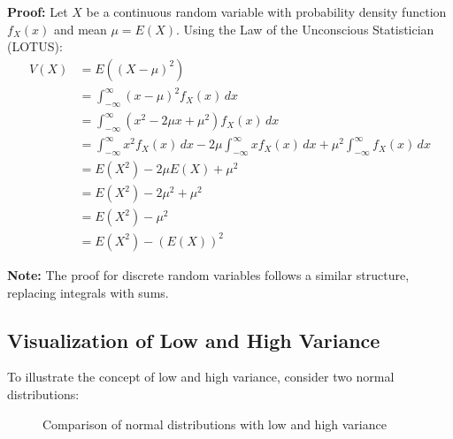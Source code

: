 \documentclass{article}
\begin{document}
    \noindent
    \textbf{Proof:}
    Let $X$ be a continuous random variable with probability density function $f_X(x)$ and mean $\mu = E(X)$.
    Using the Law of the Unconscious Statistician (LOTUS):
    \begin{align*}
        V(X) &= E((X - \mu)^2) \\
             &= \int_{-\infty}^{\infty} (x - \mu)^2 f_X(x) \, dx \\
             &= \int_{-\infty}^{\infty} (x^2 - 2\mu x + \mu^2) f_X(x) \, dx \\
             &= \int_{-\infty}^{\infty} x^2 f_X(x) \, dx - 2\mu \int_{-\infty}^{\infty} x f_X(x) \, dx + \mu^2 \int_{-\infty}^{\infty} f_X(x) \, dx \\
             &= E(X^2) - 2\mu E(X) + \mu^2 \\
             &= E(X^2) - 2\mu^2 + \mu^2 \\
             &= E(X^2) - \mu^2 \\
             &= E(X^2) - (E(X))^2
    \end{align*}

    \noindent
    \textbf{Note:} The proof for discrete random variables follows a similar structure, replacing integrals with sums.

    \subsection*{Visualization of Low and High Variance}

    To illustrate the concept of low and high variance, consider two normal distributions:

    \begin{figure}[h]
        \centering
        \caption{Comparison of normal distributions with low and high variance}
        \label{fig:variance_comparison}
    \end{figure}
\end{document}
